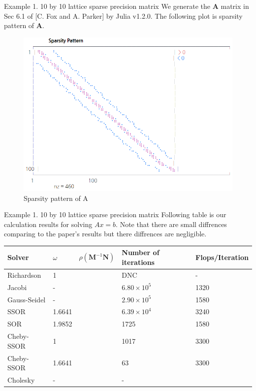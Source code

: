 \documentclass[10pt]{beamer}
\begin{document}
\begin{frame}{Example 1. 10 by 10 lattice sparse precision matrix}
We generate the $\mathbf{A}$ matrix in Sec 6.1 of [C. Fox and A. Parker] by Julia v1.2.0.
The following plot is sparsity pattern of $\mathbf{A}$.
\begin{figure}
    \includegraphics[width=0.6\columnwidth]{spy_A.png}
    \caption{Sparsity pattern of A}
    \label{fig:spyA}
\end{figure}
\end{frame}

\begin{frame}{Example 1. 10 by 10 lattice sparse precision matrix}
Following table is our calculation results for solving $Ax = b$. 
Note that there are small diffrences comparing to the paper's results
but there diffrences are negligible.
\begin{table}[]
    \begin{tabular}{@{}lllll@{}}
    \toprule
    Solver & $\omega$ & $\mathcal{\rho}(\mathbf{M}^{-1}\mathbf{N})$ & Number of iterations & Flops/Iteration \\ \midrule
    Richardson   & 1      &       & DNC         & -     \\
    Jacobi       & -      &       & $6.80 \times 10^5$ & 1320  \\
    Gauss-Seidel & -      &       & $2.90 \times 10^5$ & 1580  \\
    SSOR         & 1.6641 &       & $6.39 \times 10^4$ & 3240  \\
    SOR          & 1.9852 &       & 1725        & 1580  \\
    Cheby-SSOR   & 1      &       & 1017        & 3300  \\
    Cheby-SSOR   & 1.6641 &       & 63          & 3300  \\
    Cholesky     & -      &       & -            &      \\ \bottomrule
    \end{tabular}
\end{table}
\end{frame}
\end{document}

